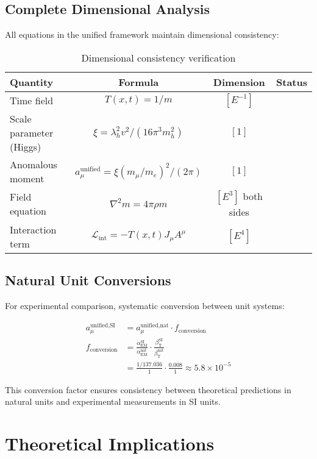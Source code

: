 \documentclass[12pt,a4paper]{article}
\newcommand{\Tfieldt}{T(x,t)}
\newcommand{\alphaEM}{\alpha_{\text{EM}}}
\newcommand{\betaT}{\beta_{\text{T}}}
\newcommand{\xipar}{\xi}
\begin{document}
	\subsection{Complete Dimensional Analysis}
	
	All equations in the unified framework maintain dimensional consistency:
	
	\begin{table}[htbp]
		\centering
		\begin{tabular}{lccl}
			\toprule
			\textbf{Quantity} & \textbf{Formula} & \textbf{Dimension} & \textbf{Status} \\
			\midrule
			Time field & $\Tfieldt = 1/m$ & $[E^{-1}]$ & \checkmark \\
			Scale parameter (Higgs) & $\xipar = \lambda_h^2 v^2/(16\pi^3 m_h^2)$ & $[1]$ & \checkmark \\
			Anomalous moment & $a_\mu^{\text{unified}} = \xipar(m_\mu/m_e)^2/(2\pi)$ & $[1]$ & \checkmark \\
			Field equation & $\nabla^2 m = 4\pi \rho m$ & $[E^3]$ both sides & \checkmark \\
			Interaction term & $\mathcal{L}_{\text{int}} = -\Tfieldt J_\mu A^\mu$ & $[E^4]$ & \checkmark \\
			\bottomrule
		\end{tabular}
		\caption{Dimensional consistency verification}
	\end{table}
	
	\subsection{Natural Unit Conversions}
	
	For experimental comparison, systematic conversion between unit systems:
	
	\begin{align}
		a_\mu^{\text{unified,SI}} &= a_\mu^{\text{unified,nat}} \cdot f_{\text{conversion}} \\
		f_{\text{conversion}} &= \frac{\alphaEM^{\text{SI}}}{\alphaEM^{\text{nat}}} \cdot \frac{\betaT^{\text{SI}}}{\betaT^{\text{nat}}} \\
		&= \frac{1/137.036}{1} \cdot \frac{0.008}{1} \approx 5.8 \times 10^{-5}
	\end{align}
	
	This conversion factor ensures consistency between theoretical predictions in natural units and experimental measurements in SI units.
	
	\section{Theoretical Implications}
	
\end{document}
